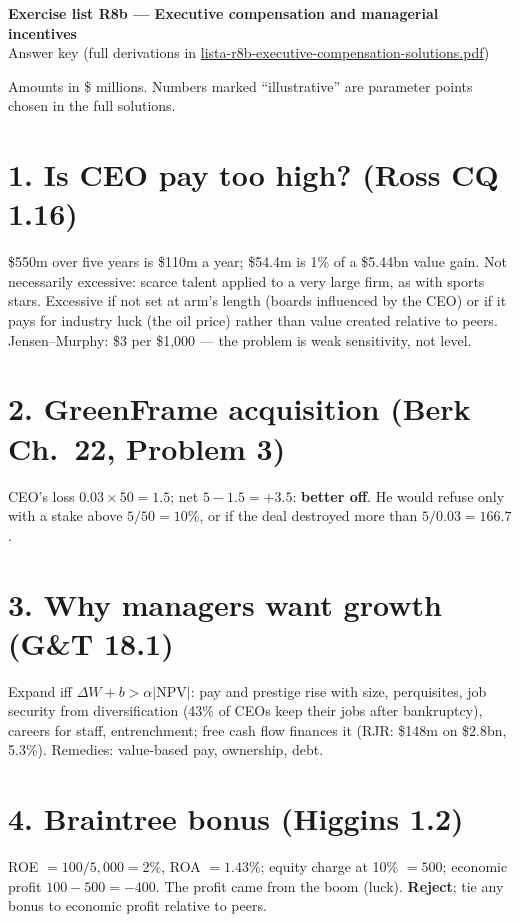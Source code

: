 \documentclass[11pt,a4paper]{article}
\begin{document}
\begin{center}{\Large\bfseries Exercise list R8b --- Executive compensation and managerial incentives}\\[4pt]{\large Answer key (full derivations in \url{lista-r8b-executive-compensation-solutions.pdf})}\end{center}

Amounts in \$ millions. Numbers marked ``illustrative'' are parameter points chosen in the full solutions.

\section*{1. Is CEO pay too high? (Ross CQ 1.16)}
\$550m over five years is \$110m a year; \$54.4m is 1\% of a \$5.44bn value gain. Not necessarily excessive:
scarce talent applied to a very large firm, as with sports stars. Excessive if not set at arm's length
(boards influenced by the CEO) or if it pays for industry luck (the oil price) rather than value created
relative to peers. Jensen--Murphy: \$3 per \$1{,}000 --- the problem is weak sensitivity, not level.

\section*{2. GreenFrame acquisition (Berk Ch.~22, Problem 3)}
CEO's loss $0.03\times50=1.5$; net $5-1.5=+3.5$: \textbf{better off}. He would refuse only with a stake above
$5/50=10\%$, or if the deal destroyed more than $5/0.03=166.7$.

\section*{3. Why managers want growth (G\&T 18.1)}
Expand iff $\Delta W+b>\alpha|\mathrm{NPV}|$: pay and prestige rise with size, perquisites, job security from
diversification (43\% of CEOs keep their jobs after bankruptcy), careers for staff, entrenchment; free cash
flow finances it (RJR: \$148m on \$2.8bn, 5.3\%). Remedies: value-based pay, ownership, debt.

\section*{4. Braintree bonus (Higgins 1.2)}
ROE $=100/5{,}000=2\%$, ROA $=1.43\%$; equity charge at 10\% $=500$; economic profit $100-500=-400$. The
profit came from the boom (luck). \textbf{Reject}; tie any bonus to economic profit relative to peers.
\end{document}

